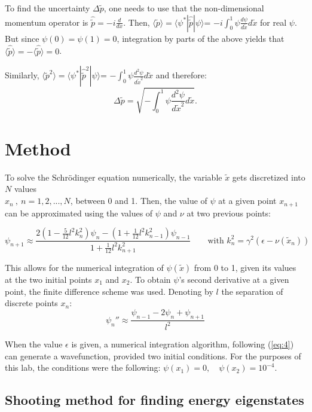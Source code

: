 \documentclass[11pt]{article}
\begin{document}
To find the uncertainty $\Delta \tilde{p}$, one needs to use that the 
non-dimensional momentum operator is $\hat{\tilde{p}}=-i\frac{d}{dx}$.
Then, $\langle \tilde{p}\rangle=\langle\psi^*|\hat{\tilde{p}}|\psi\rangle$=
$-i\int_0^1\psi\frac{d\psi}{d\tilde{x}}d\tilde{x}$ for real $\psi$. But since
$\psi(0)=\psi(1)=0$, integration by parts of the above yields that
$\langle\hat{\tilde{p}}\rangle=-\langle\hat{\tilde{p}}\rangle=0$.

Similarly, $\langle \tilde{p}^2\rangle=\langle\psi^*|\hat{\tilde{p}}^2|\psi\rangle$=
$-\int_0^1\psi\frac{d^2\psi}{d\tilde{x}^2}d\tilde{x}$ and therefore:
\begin{equation}
  \Delta\tilde{p}=\sqrt{-\int_0^1\psi\frac{d^2\psi}{d\tilde{x}^2}d\tilde{x}}.
\end{equation}

\section{Method}

To solve the Schr{\"o}dinger equation numerically, the variable $\tilde{x}$ gets
discretized into $N$ values\\
 $x_n\ ,\ n=1,2,...,N$, between 0 and 1. Then, 
the value of $\psi$ at a given point $x_{n+1}$ can be approximated using the
values of $\psi$ and $\nu$ at two previous points:

\begin{equation} 
  \label{eq:4}
  \psi_{n+1}\approx\frac{2(1-\frac{5}{12}l^2k_n^2)\psi_n-(1+\frac{1}{12}l^2k^2_{n-1})\psi_{n-1}}{1+\frac{1}{12}l^2k^2_{n+1}}
  \qquad\text{with }k_n^2=\gamma^2(\epsilon-\nu(\tilde{x}_n))
\end{equation}

This allows for the numerical integration of $\psi(\tilde{x})$ from 0 to 1,
 given its values at the two
initial points $x_1$ and $x_2$.
To obtain $\psi$'s second derivative at a given point, the finite difference
scheme was used. Denoting by $l$ the separation of discrete points $x_n$:
\begin{equation}
  \psi_n''\approx\frac{\psi_{n-1}-2\psi_n+\psi_{n+1}}{l^2}
\end{equation}

When the value $\epsilon$ is given, a numerical integration algorithm, following
(\ref{eq:4}) can 
generate a wavefunction, provided two initial conditions.
For the purposes of this lab, the conditions were the following:
$\psi(x_1)=0,\quad \psi(x_2)=10^{-4}$.

\subsection{Shooting method for finding energy eigenstates}
\end{document}
